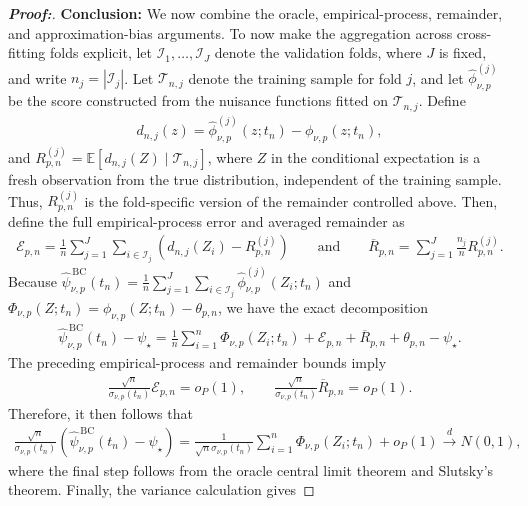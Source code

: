 \documentclass[10pt,a4paper]{amsart}
\begin{document}
\begin{proof}[\textbf{Proof:}]
\medskip
\noindent\textbf{Conclusion:}
We now combine the oracle, empirical-process, remainder, and approximation-bias arguments. To now make the aggregation across cross-fitting folds explicit, let $\mathcal{I}_1,\ldots,\mathcal{I}_J$ denote the validation folds, where $J$ is fixed, and write $n_j=|\mathcal{I}_j|$. Let $\mathcal{T}_{n,j}$ denote the training sample for fold $j$, and let $\widehat\phi_{\nu,p}^{(j)}$ be the score constructed from the nuisance functions fitted on $\mathcal{T}_{n,j}$. Define
\begin{align*}
     d_{n,j}(z) = \widehat\phi_{\nu,p}^{(j)}(z;t_n) - \phi_{\nu,p}(z;t_n),
\end{align*}
and $R_{p,n}^{(j)} = \mathbb{E}\!\left[d_{n,j}(Z) \mid \mathcal{T}_{n,j}\right]$, where $Z$ in the conditional expectation is a fresh observation from the true distribution, independent of the training sample. Thus, $R_{p,n}^{(j)}$ is the fold-specific version of the remainder controlled above. Then, define the full empirical-process error and averaged remainder as
\begin{align*}
    \mathcal{E}_{p,n} = \frac{1}{n} \sum_{j=1}^{J} \sum_{i\in\mathcal{I}_j}\left( d_{n,j}(Z_i)-R_{p,n}^{(j)} \right) \qquad \text{and} \qquad \overline{R}_{p,n} = \sum_{j=1}^{J} \frac{n_j}{n}R_{p,n}^{(j)}.
\end{align*}
Because $\widehat\psi_{\nu,p}^{\,\mathrm{BC}}(t_n) =\frac{1}{n} \sum_{j=1}^{J} \sum_{i\in\mathcal{I}_j} \widehat\phi_{\nu,p}^{(j)}(Z_i;t_n)$ and
$\Phi_{\nu,p}(Z;t_n)=\phi_{\nu,p}(Z;t_n)-\theta_{p,n}$, we have the exact decomposition
\begin{align*}
    \widehat\psi_{\nu,p}^{\,\mathrm{BC}}(t_n)-\psi_\star = \frac{1}{n} \sum_{i=1}^{n}\Phi_{\nu,p}(Z_i;t_n) + \mathcal{E}_{p,n} + \overline{R}_{p,n} + \theta_{p,n}-\psi_\star.
\end{align*}
The preceding empirical-process and remainder bounds imply
\begin{align*}
    \frac{\sqrt{n}}{\sigma_{\nu,p}(t_n)} \mathcal{E}_{p,n} = o_P(1),\qquad \frac{\sqrt{n}}{\sigma_{\nu,p}(t_n)} \overline{R}_{p,n} = o_P(1).
\end{align*}
Therefore, it then follows that
\begin{align*}
    \frac{\sqrt{n}}{\sigma_{\nu,p}(t_n)} \left( \widehat\psi_{\nu,p}^{\,\mathrm{BC}}(t_n)-\psi_\star \right) = \frac{1}{\sqrt{n}\sigma_{\nu,p}(t_n)} \sum_{i=1}^{n}\Phi_{\nu,p}(Z_i;t_n) + o_P(1) \overset{d}{\longrightarrow} N(0,1),
\end{align*}
where the final step follows from the oracle central limit theorem and Slutsky's theorem. Finally, the variance calculation gives

\end{proof}
\end{document}
